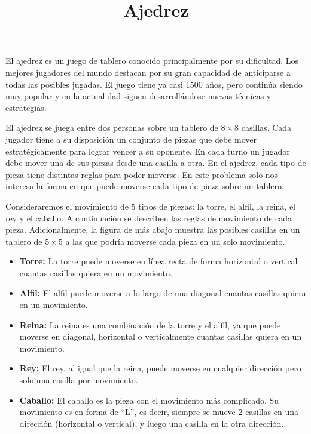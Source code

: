 \documentclass{oci}
\title{Ajedrez}
\begin{document}
\begin{problemDescription}
  El ajedrez es un juego de tablero conocido principalmente por su dificultad.
  Los mejores jugadores del mundo destacan por su gran capacidad de anticiparse a todas las posibles jugadas.
  El juego tiene ya casi 1500 años, pero continúa siendo muy popular y en la actualidad siguen desarrollándose nuevas técnicas y estrategias.
  
  El ajedrez se juega entre dos personas sobre un tablero de $8\times 8$ casillas.
  Cada jugador tiene a su disposición un conjunto de piezas que debe mover estratégicamente para lograr vencer a su oponente.
  En cada turno un jugador debe mover una de sus piezas desde una casilla a otra.
  En el ajedrez, cada tipo de pieza tiene distintas reglas para poder moverse.
  En este problema solo nos interesa la forma en que puede moverse cada tipo de pieza sobre un tablero.
  
  Consideraremos el movimiento de 5 tipos de piezas: la torre, el alfil, la reina, el rey y el caballo.
  A continuación se describen las reglas de movimiento de cada pieza.
  Adicionalmente, la figura de más abajo muestra las posibles casillas en un tablero de $5\times 5$ a las que podría moverse cada pieza en un solo movimiento.
  \begin{itemize}
    \item \textbf{Torre:} La torre puede moverse en línea recta de forma horizontal o vertical cuantas casillas quiera en un movimiento.
    \item \textbf{Alfil:} El alfil puede moverse a lo largo de una diagonal cuantas casillas quiera en un movimiento.
    \item \textbf{Reina:} La reina es una combinación de la torre y el alfil, ya que puede moverse en diagonal, horizontal o verticalmente cuantas casillas quiera en un movimiento.
    \item \textbf{Rey:} El rey, al igual que la reina, puede moverse en cualquier dirección pero solo una casilla por movimiento.
    \item \textbf{Caballo:} El caballo es la pieza con el movimiento más complicado. Su movimiento es en forma de ``L'', es decir, siempre se mueve 2 casillas en una dirección (horizontal o vertical), y luego una casilla en la otra dirección.
  \end{itemize}
  

\end{problemDescription}
\end{document}
